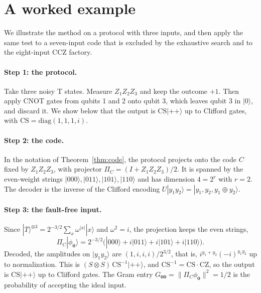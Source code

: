 \documentclass[aps,prl,reprint,twocolumn,amsmath,amssymb,floatfix,nofootinbib,superscriptaddress]{revtex4-2}
\newcommand{\CS}{\mathrm{CS}}
\begin{document}
%
\section{A worked example}\label{app:example}
We illustrate the method on a protocol with three inputs, and then apply the same test to a seven-input code that is excluded by the exhaustive search and to the eight-input CCZ factory.

\paragraph*{Step 1: the protocol.}
Take three noisy T states. Measure $Z_1Z_2Z_3$ and keep the outcome $+1$. Then apply CNOT gates from qubits 1 and 2 onto qubit 3, which leaves qubit 3 in $|0\rangle$, and discard it. We show below that the output is $\CS|{+}{+}\rangle$ up to Clifford gates, with $\CS=\mathrm{diag}(1,1,1,i)$.

\paragraph*{Step 2: the code.}
In the notation of Theorem~\ref{thm:code}, the protocol projects onto the code $C$ fixed by $Z_1Z_2Z_3$, with projector $\Pi_C=(I+Z_1Z_2Z_3)/2$. It is spanned by the even-weight strings $|000\rangle,|011\rangle,|101\rangle,|110\rangle$ and has dimension $4=2^r$ with $r=2$. The decoder is the inverse of the Clifford encoding $U|y_1y_2\rangle=|y_1,y_2,y_1\oplus y_2\rangle$.

\paragraph*{Step 3: the fault-free input.}
Since $|T\rangle^{\otimes3}=2^{-3/2}\sum_x\omega^{|x|}|x\rangle$ and $\omega^2=i$, the projection keeps the even strings,
\begin{equation}
 \Pi_C|\phi_{\mathbf0}\rangle=2^{-3/2}\bigl(|000\rangle+i|011\rangle+i|101\rangle+i|110\rangle\bigr).
\end{equation}
Decoded, the amplitudes on $|y_1y_2\rangle$ are $(1,i,i,i)/2^{3/2}$, that is, $i^{y_1+y_2}(-i)^{y_1y_2}$ up to normalization. This is $(S\otimes S)\,\CS^{-1}|{+}{+}\rangle$, and $\CS^{-1}=\CS\cdot\mathrm{CZ}$, so the output is $\CS|{+}{+}\rangle$ up to Clifford gates. The Gram entry $G_{\mathbf0\mathbf0}=\|\Pi_C\phi_{\mathbf0}\|^2=1/2$ is the probability of accepting the ideal input.
\end{document}

